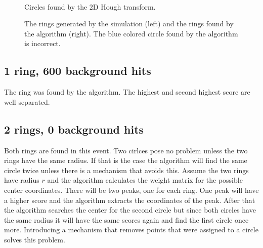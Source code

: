 \documentclass[11pt]{scrreprt}
\begin{document}
\begin{figure}[htp]
        \centering
        ~ %
        ~ %
              
        \caption{Circles found by the 2D Hough transform.}\label{fig:2D_HT_results1}

        \caption{The rings generated by the simulation (left) and the rings found by the algorithm (right). The blue colored circle found by the algorithm is incorrect.}
        \label{fig:2d_6c_200_bg2}
\end{figure}

\subsection{1 ring, 600 background hits} %
\label{sub:1_ring_600_background_hits}
The ring was found by the algorithm. The highest and second highest score are well separated. 

\subsection{2 rings, 0 background hits} %
\label{sub:2d_hough_transform_2_circles_0_background}
Both rings are found in this event. Two cirlces pose no problem unless the two rings have the same radius. If that is the case the algorithm will find the same circle twice unless there is a mechanism that avoids this. Assume the two rings have radius $r$ and the algorithm calculates the weight matrix for the possible center coordinates. There will be two peaks, one for each ring. One peak will have a higher score and the algorithm extracts the coordinates of the peak. After that the algorithm searches the center for the second circle but since both circles have the same radius it will have the same scores again and find the first circle once more. Introducing a mechanism that removes points that were assigned to a circle solves this problem.
\end{document}
